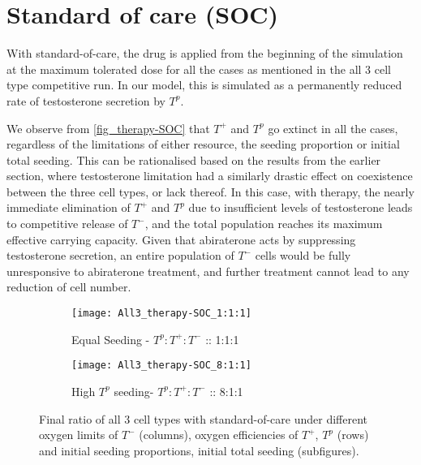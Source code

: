 \section{Standard of care (SOC)}
With standard-of-care, the drug is applied from the beginning of the simulation at the maximum tolerated dose for all the cases as mentioned in the all 3 cell type competitive run. In our model, this is simulated as a permanently reduced rate of testosterone secretion by $T^p$.

We observe from \autoref{fig_therapy-SOC} that $T^+$ and $T^p$ go extinct in all the cases, regardless of the limitations of either resource, the seeding proportion or initial total seeding. This can be rationalised based on the results from the earlier section, where testosterone limitation had a similarly drastic effect on coexistence between the three cell types, or lack thereof. In this case, with therapy, the nearly immediate elimination of $T^+$ and $T^p$ due to insufficient levels of testosterone leads to competitive release of $T^-$, and the total population reaches its maximum effective carrying capacity. Given that abiraterone acts by suppressing testosterone secretion, an entire population of $T^-$ cells would be fully unresponsive to abiraterone treatment, and further treatment cannot lead to any reduction of cell number.

\begin{figure}[h!]
  \centering
  \begin{subfigure}[b]{\textwidth}
    \centering
    \texttt{[image: All3\_therapy-SOC\_1:1:1]}
    \caption{Equal Seeding - $T^p:T^+:T^-$ :: 1:1:1}
    \label{fig_therapy-SOC_1:1:1}
  \end{subfigure}
  \begin{subfigure}[b]{\textwidth}
    \centering
    \texttt{[image: All3\_therapy-SOC\_8:1:1]}
    \caption{High $T^p$ seeding- $T^p:T^+:T^-$ :: 8:1:1}
    \label{fig_therapy-SOC_8:1:1}
  \end{subfigure}
  \caption[Final ratio of all 3 cell types with standard-of-care]{Final ratio of all 3 cell types with standard-of-care under different oxygen limits of $T^-$ (columns), oxygen efficiencies of $T^+$, $T^p$ (rows) and initial seeding proportions, initial total seeding (subfigures).}
  \label{fig_therapy-SOC}
\end{figure}

\newpage

